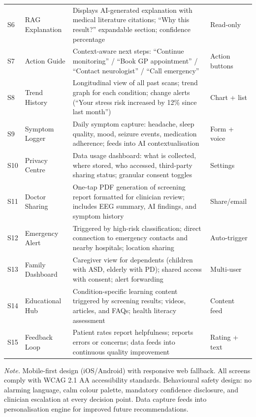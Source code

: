 {\begin{xltabular}{\textwidth}{@{} >{\raggedright\arraybackslash}p{1.0cm} >{\raggedright\arraybackslash}p{2.7cm} p{7.9cm} >{\raggedright\arraybackslash}p{2.5cm} @{}}
\addlinespace
S6 & RAG Explanation & Displays AI-generated explanation with medical literature citations; ``Why this result?'' expandable section; confidence percentage & Read-only \\
\addlinespace
S7 & Action Guide & Context-aware next steps: ``Continue monitoring'' / ``Book GP appointment'' / ``Contact neurologist'' / ``Call emergency'' & Action buttons \\
\addlinespace
S8 & Trend History & Longitudinal view of all past scans; trend graph for each condition; change alerts (``Your stress risk increased by 12\% since last month'') & Chart + list \\
\addlinespace
S9 & Symptom Logger & Daily symptom capture: headache, sleep quality, mood, seizure events, medication adherence; feeds into AI contextualisation & Form + voice \\
\addlinespace
S10 & Privacy Centre & Data usage dashboard: what is collected, where stored, who accessed, third-party sharing status; granular consent toggles & Settings \\
\addlinespace
S11 & Doctor Sharing & One-tap PDF generation of screening report formatted for clinician review; includes EEG summary, AI findings, and symptom history & Share/email \\
\addlinespace
S12 & Emergency Alert & Triggered by high-risk classification; direct connection to emergency contacts and nearby hospitals; location sharing & Auto-trigger \\
\addlinespace
S13 & Family Dashboard & Caregiver view for dependents (children with ASD, elderly with PD); shared access with consent; alert forwarding & Multi-user \\
\addlinespace
S14 & Educational Hub & Condition-specific learning content triggered by screening results; videos, articles, and FAQs; health literacy assessment & Content feed \\
\addlinespace
S15 & Feedback Loop & Patient rates report helpfulness; reports errors or concerns; data feeds into continuous quality improvement & Rating + text \\
\end{xltabular}}
\vspace{0.5em}
\noindent\textit{Note.} Mobile-first design (iOS/Android) with responsive web fallback. All screens comply with WCAG 2.1 AA accessibility standards. Behavioural safety design: no alarming language, calm colour palette, mandatory confidence disclosure, and clinician escalation at every decision point. Data capture feeds into personalisation engine for improved future recommendations.
\fi %

